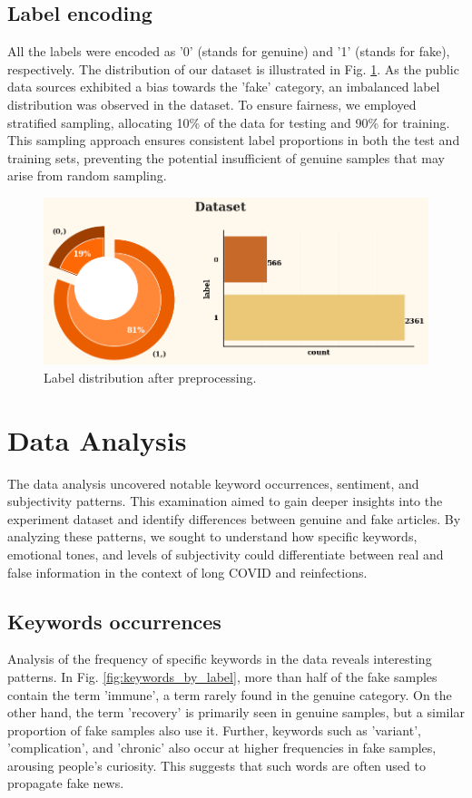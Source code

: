 \subsection{Label encoding}
All the labels were encoded as '0' (stands for genuine) and '1' (stands for fake), respectively. The distribution of our dataset is illustrated in Fig. \ref{fig:data distribution}. As the public data sources exhibited a bias towards the 'fake' category, an imbalanced label distribution was observed in the dataset. To ensure fairness, we employed stratified sampling, allocating 10\% of the data for testing and 90\% for training. This sampling approach ensures consistent label proportions in both the test and training sets, preventing the potential insufficient of genuine samples that may arise from random sampling.



\begin{figure}
  \centering
  \includegraphics[width=1\columnwidth]{img/data distribution.png}
  \caption{Label distribution after preprocessing.} 
  \vspace{-0.4cm}
  \label{fig:data distribution}
\end{figure}

\section{Data Analysis}
The data analysis uncovered notable keyword occurrences, sentiment, and subjectivity patterns. This examination aimed to gain deeper insights into the experiment dataset and identify differences between genuine and fake articles. By analyzing these patterns, we sought to understand how specific keywords, emotional tones, and levels of subjectivity could differentiate between real and false information in the context of long COVID and reinfections.
\subsection{Keywords occurrences}
Analysis of the frequency of specific keywords in the data reveals interesting patterns. In Fig. \ref {fig:keywords_by_label}, more than half of the fake samples contain the term 'immune', a term rarely found in the genuine category. On the other hand, the term 'recovery' is primarily seen in genuine samples, but a similar proportion of fake samples also use it. Further, keywords such as 'variant', 'complication', and 'chronic' also occur at higher frequencies in fake samples, arousing people's curiosity. This suggests that such words are often used to propagate fake news.

